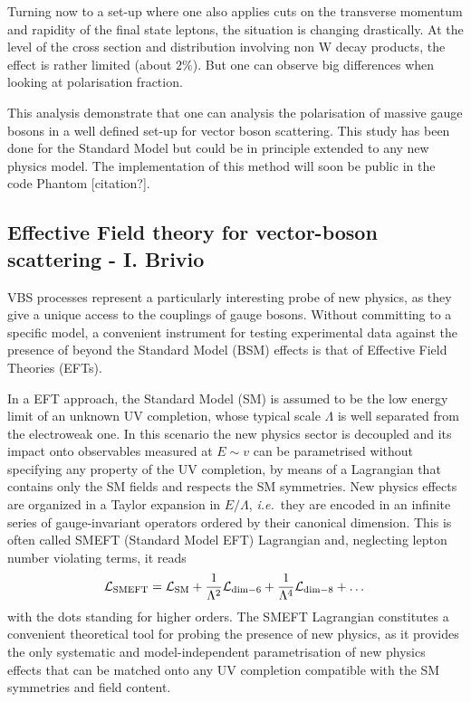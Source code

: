 Turning now to a set-up where one also applies cuts on the transverse momentum and rapidity of the final state leptons, the situation is changing drastically.
At the level of the cross section and distribution involving non W decay products, the effect is rather limited (about $2\%$).
But one can observe big differences when looking at polarisation fraction.

This analysis demonstrate that one can analysis the polarisation of massive gauge bosons in a well defined set-up for vector boson scattering.
This study has been done for the Standard Model but could be in principle extended to any new physics model.
The implementation of this method will soon be public in the code Phantom [citation?]. \\

\subsection{Effective Field theory for vector-boson scattering - I. Brivio}

VBS processes represent a particularly interesting probe of new physics, as they give a unique access to the couplings of gauge bosons.
Without committing to a specific model, a convenient instrument for testing experimental data against the presence of beyond the Standard Model (BSM) effects is that of Effective Field Theories (EFTs).

In a EFT approach, the Standard Model (SM) is assumed to be the low energy limit of an unknown UV completion, whose typical scale $\Lambda$ is well separated from the electroweak one.
In this scenario the new physics sector is decoupled and its impact onto observables measured at $E\sim v$ can be parametrised without specifying any property of the UV completion, by means of a Lagrangian that contains only the SM fields and respects the SM symmetries.
New physics effects are organized in a Taylor expansion in $E/\Lambda$, \emph{i.e.}\ they are encoded in an infinite series of gauge-invariant operators ordered by their canonical dimension.
This is often called SMEFT (Standard Model EFT) Lagrangian and, neglecting lepton number violating terms, it reads
\begin{equation}
 \mathcal{L}_{\rm SMEFT} = \mathcal{L}_{\rm SM} + \frac{1}{\Lambda^2}\mathcal{L}_{\rm dim-6} + \frac{1}{\Lambda^4}\mathcal{L}_{\rm dim-8} + \dots
\end{equation} 
with the dots standing for higher orders.
The SMEFT Lagrangian constitutes a convenient theoretical tool for probing the presence of new physics, as it provides the only systematic and model-independent parametrisation of new physics effects that can be matched onto any UV completion compatible with the SM symmetries and field content.

